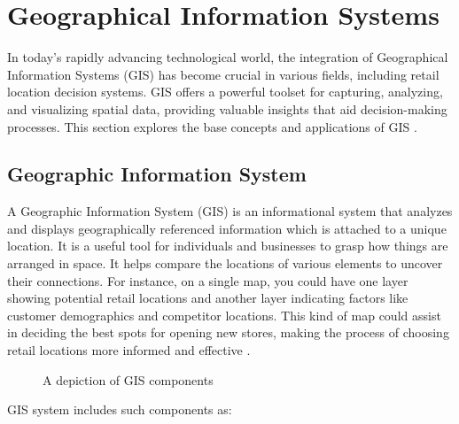 \chapter{Geographical Information Systems}
\label{ch:3}

In today's rapidly advancing technological world, the integration of Geographical Information Systems (GIS) has become crucial in various fields, including retail location decision systems. GIS offers a powerful toolset for capturing, analyzing, and visualizing spatial data, providing valuable insights that aid decision-making processes. This section explores the base concepts and applications of GIS \cite{gis2018tools}.

\section{Geographic Information System}
A Geographic Information System (GIS) is an informational system that analyzes and displays geographically referenced information which is attached to a unique location. It is a useful tool for individuals and businesses to grasp how things are arranged in space. It helps compare the locations of various elements to uncover their connections. For instance, on a single map, you could have one layer showing potential retail locations and another layer indicating factors like customer demographics and competitor locations. This kind of map could assist in deciding the best spots for opening new stores, making the process of choosing retail locations more informed and effective \cite{gis2018geographic, roig2013retail}.

\begin{figure}[ht]
	\centering
	
	\caption{A depiction of GIS components \cite{gis2018geographic}}
	\label{fig:gis}
\end{figure}

GIS system includes such components as: 

